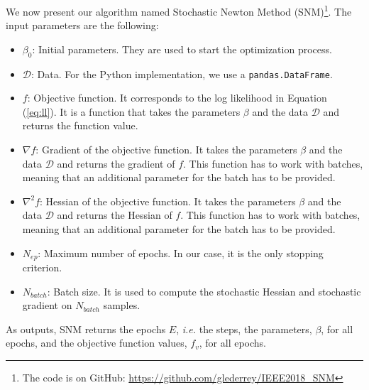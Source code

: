 \documentclass[conference]{IEEEtran}
\begin{document}
We now present our algorithm named Stochastic Newton Method (SNM)\footnote{The code is on GitHub: \href{https://github.com/glederrey/IEEE2018\_SNM}{https://github.com/glederrey/IEEE2018\_SNM}}. The input parameters are the following:
\begin{itemize}
\item $\beta_0$: Initial parameters. They are used to start the optimization process.
\item $\mathcal{D}$: Data. For the Python implementation, we use a \texttt{pandas.DataFrame}.
\item $f$: Objective function. It corresponds to the log likelihood in Equation (\ref{eq:ll}). It is a function that takes the parameters $\beta$ and the data $\mathcal{D}$ and returns the function value.
\item $\nabla f$: Gradient of the objective function. It takes the parameters $\beta$ and the data $\mathcal{D}$ and returns the gradient of $f$. This function has to work with batches, meaning that an additional parameter for the batch has to be provided.
\item $\nabla^2 f$: Hessian of the objective function. It takes the parameters $\beta$ and the data $\mathcal{D}$ and returns the Hessian of $f$. This function has to work with batches, meaning that an additional parameter for the batch has to be provided.
\item $N_{ep}$: Maximum number of epochs. In our case, it is the only stopping criterion.
\item $N_{batch}$: Batch size. It is used to compute the stochastic Hessian and stochastic gradient on $N_{batch}$ samples.
\end{itemize}
As outputs, SNM returns the epochs $E$, {\it i.e.} the steps, the parameters, $\beta$, for all epochs, and the objective function values, $f_v$, for all epochs. 
\end{document}
